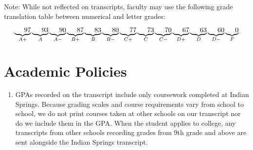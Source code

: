 Note:  While not reflected on transcripts, faculty may use the following grade translation table between numerical and letter grades:


	$$\underbrace{ \hspace{5mm} 97}_{A+}
  \underbrace{\hspace{5mm} 93}_{A}
  \underbrace{\hspace{5mm} 90}_{A-}
  \underbrace{\hspace{5mm} 87}_{B+}
  \underbrace{\hspace{5mm} 83}_{B}
  \underbrace{\hspace{5mm} 80}_{B-}
  \underbrace{\hspace{5mm} 77}_{C+}
  \underbrace{\hspace{5mm} 73}_{C}
  \underbrace{\hspace{5mm} 70}_{C-}
  \underbrace{\hspace{5mm} 67}_{D+}
  \underbrace{\hspace{5mm} 63}_{D}
  \underbrace{\hspace{5mm} 60}_{D-}
  \underbrace{\hspace{5mm} 0}_{F}$$
  
  



\section{Academic Policies}

\begin{enumerate}
  \item GPAs recorded on the transcript include only coursework completed at Indian Springs.  Because grading scales and course requirements vary from school to school, we do not print courses taken at other schools on our transcript nor do we include them in the GPA.  When the student applies to college, any transcripts from other schools recording grades from 9th grade and above are sent alongside the Indian Springs transcript.
\end{enumerate}





